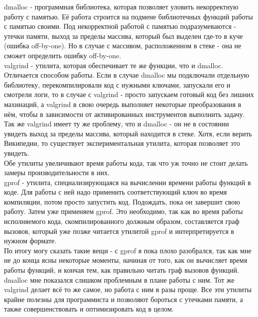 \documentclass[12pt]{article}
\begin{document}
dmalloc - программная библиотека, которая позволяет уловить некорректную работу с памятью. Её работа строится на подмене библиотечных функций работы с памятью своими. Под некорректной работой с памятью подразумеваются - утечки памяти, выход за пределы массива, который был выделен где-то в куче (ошибка off-by-one). Но в случае с массивом, расположенном в стеке - она не сможет определить ошибку off-by-one.\\
valgrind - утилита, которая обеспечивает те же функции, что и dmalloc. Отличается способом работы. Если в случае dmalloc мы подключали отдельную библиотеку, перекомпилировали код с нужными ключами, запускали его и смотрели логи, то в случае с valgrind - просто запускаем готовый код без лишних махинаций, а valgrind в свою очередь выполняет некоторые преобразования в нём, чтобы в зависимости от активированных инструментов выполнить задачу. Так же valgrind имеет ту же проблему, что и dmalloc - он не в состоянии увидеть выход за пределы массива, который находится в стеке. Хотя, если верить Википедии, то существует экспериментальная утилита, которая позволяет это увидеть.\\
Обе утилиты увеличивают время работы кода, так что уж точно не стоит делать замеры производительности в них.\\
gprof - утилита, специализирующаяся на вычислении времени работы функций в коде. Для работы с ней надо применить соответствующий ключ во время компиляции, потом просто запустить код. Подождать, пока он завершит свою работу. Затем уже применяем gprof. Это необходимо, так как во время работы исполняемого кода, скомпилированного должным образом, составляется граф вызовов, который уже позже читается утилитой gprof и интерпретируется в нужном формате.\\
По итогу могу сказать такие вещи - с gprof я пока плохо разобрался, так как мне не до конца ясны некоторые моменты, начиная от того, как он вычисляет время работы функций, и кончая тем, как правильно читать граф вызовов функций. dmalloc мне показался слишком проблемным в плане работы с ним. Тот же valgrind делает всё то же самое, но работа с ним в разы проще. Все эти утилиты крайне полезны для программиста и позволяют бороться с утечками памяти, а также совершенствовать и оптимизировать код в целом.
\end{document}
